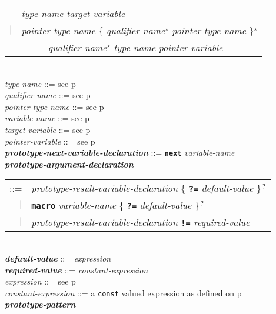\documentclass[12pt]{article}
\newcommand{\TT}[1]{{\tt \bfseries #1}}
\newcommand{\STAR}{{\Large $^\star$}}
\newcommand{\QMARK}{{$^{\,\mbox{\footnotesize ?}}$}}
\newcommand{\ttkey}[1]{{\tt \bfseries #1}}
\newcommand{\emkey}[1]{{\em \bfseries #1}}
\newcommand{\pagref}[1]{p\pageref{#1}}
\newenvironment{indpar}[1][0.3in]%
	{\begin{list}{}%
		     {\setlength{\itemsep}{0in}%
		      \setlength{\topsep}{0in}%
		      \setlength{\parsep}{1ex}%
		      \setlength{\labelwidth}{#1}%
		      \setlength{\leftmargin}{#1}%
		      \addtolength{\leftmargin}{\labelsep}}%
	 \item}%
	{\end{list}}
\begin{document}
\begin{indpar}[0.1in]
\hspace*{0.5in}\begin{tabular}{rl}
	    & {\em type-name} {\em target-variable} \\
	$|$ & {\em pointer-type-name}
              \{ {\em qualifier-name}\STAR{} {\em pointer-type-name}
	      \}\STAR{} \\
	& ~~~~~ {\em qualifier-name}\STAR{}
	        {\em type-name} {\em pointer-variable}
	\end{tabular}
\\[0.5ex]
{\em type-name} ::= see \pagref{TYPE-NAME}
\\[0.5ex]
{\em qualifier-name} ::= see \pagref{QUALIFIER-NAME}
\\[0.5ex]
{\em pointer-type-name} ::= see \pagref{POINTER-TYPE-NAME}
\\[0.5ex]
{\em variable-name} ::= see \pagref{VARIABLE-NAME}
\\[0.5ex]
{\em target-variable} ::= see \pagref{TARGET-VARIABLE}
\\[0.5ex]
{\em pointer-variable} ::= see \pagref{POINTER-VARIABLE}
\\[0.5ex]
\emkey{prototype-next-variable-declaration}%
    \label{PROTOTYPE-NEXT-VARIABLE-DECLARATION}
      ::= \ttkey{next} {\em variable-name}
\\[0.5ex]
\emkey{prototype-argument-declaration}\label{PROTOTYPE-ARGUMENT-DECLARATION} \\
\hspace*{0.5in}\begin{tabular}[t]{@{}rl@{}}
    ::= & {\em prototype-result-variable-declaration}
          \{ \TT{?=} {\em default-value} \}\QMARK{} \\
    $|$ & \TT{macro} {\em variable-name}
          \{ \TT{?=} {\em default-value} \}\QMARK{} \\
    $|$ & {\em prototype-result-variable-declaration}
          \TT{!=} {\em required-value} \\
    \end{tabular}
\\[0.5ex]
\emkey{default-value} ::= {\em expression}
\\[0.5ex]
\emkey{required-value} ::= {\em constant-expression}
\\[0.5ex]
{\em expression} ::= see \pagref{EXPRESSION}
\\[0.5ex]
{\em constant-expression} ::= a {\tt const} valued expression as
    defined on \pagref{CONSTANT-EXPRESSION}
\\[0.5ex]
\emkey{prototype-pattern}\label{PROTOTYPE-PATTERN}

\end{indpar}
\end{document}
